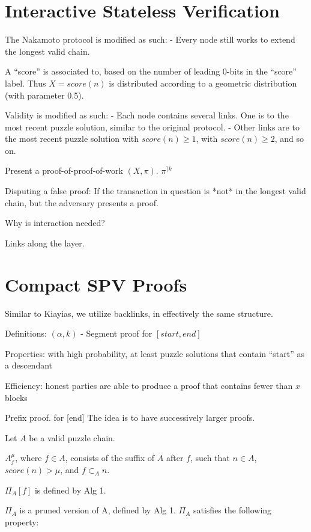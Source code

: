 \documentclass[11pt]{llncs}
\begin{document}
\section{Interactive Stateless Verification}

The Nakamoto protocol is modified as such:
- Every node still works to extend the longest valid chain.

A ``score'' is associated to, based on the number of leading 0-bits in the
``score'' label. Thus $X = score(n)$ is distributed according to a geometric distribution (with parameter 0.5).

Validity is modified as such:
- Each node contains several links. One is to the most recent puzzle solution, similar to the original protocol.
- Other links are to the most recent puzzle solution with $score(n) \geq
1$,  with $score(n) \geq 2$, and so on.

Present a proof-of-proof-of-work $(X, \pi)$. $\pi^{\rceil k}$

Disputing a false proof:
    If the transaction in question is *not* in the longest valid chain, but the adversary presents a proof.

Why is interaction needed?

Links along the layer.

\section{Compact SPV Proofs}

Similar to Kiayias, we utilize backlinks, in effectively the same structure.

Definitions:
$(\alpha, k)$ - Segment proof for $[start, end]$

Properties:
with high probability, at least puzzle solutions that contain ``start'' as a descendant

Efficiency:
	honest parties are able to produce a proof that contains fewer than $x$ blocks

Prefix proof.  for [end]
    The idea is to have successively larger proofs.

Let $A$ be a valid puzzle chain.

$A_{f}^{\mu}$, where $f \in A$, consists of the suffix of $A$ after
$f$, such that $n \in A$, $score(n) > \mu$, and $f \subset_A n$.

$\Pi_A[f]$  is defined by Alg 1.

$\Pi_{A}$ is a pruned version of A, defined by Alg 1.
$\Pi_{A}$ satisfies the following property:
\end{document}
